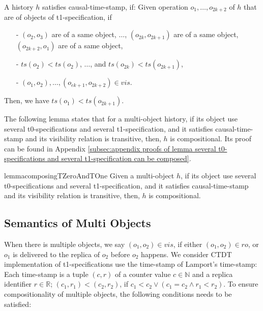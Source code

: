 A history $h$ satisfies causal-time-stamp, if: Given operation $o_1,\ldots,o_{\mathit{2k+2}}$ of $h$ that are of objects of t1-specification, if 

\begin{itemize}
\setlength{\itemsep}{0.5pt}
\item[-] $(o_2,o_3)$ are of a same object, $\ldots$, $(o_{\mathit{2k}},o_{\mathit{2k+1}})$ are of a same object, $(o_{\mathit{2k+2}},o_1)$ are of a same object, 

\item[-] $\mathit{ts}(o_2) < \mathit{ts}(o_2)$, $\ldots$, and $\mathit{ts}(o_{\mathit{2k}}) < \mathit{ts}(o_{\mathit{2k+1}})$, 

\item[-] $(o_1,o_2), \ldots, (o_{\mathit{ek+1}},o_{\mathit{2k+2}}) \in \mathit{vis}$. 
\end{itemize} 

Then, we have $\mathit{ts}(o_1) < \mathit{ts}(o_{\mathit{2k+1}})$. 

The following lemma states that for a multi-object history, if its object use several t0-specifications and several t1-specification, and it satisfies causal-time-stamp and its visibility relation is transitive, then, $h$ is compositional. Its proof can be found in Appendix \ref{subsec:appendix proofs of lemma several t0-specifications and several t1-specification can be composed}.

\begin{restatable}{lemma}{composingTZeroAndTOne}
\label{lemma:several t0-specifications and several t1-specification can be composed}
Given a multi-object $h$, if its object use several t0-specifications and several t1-specification, and it satisfies causal-time-stamp and its visibility relation is transitive, then, $h$ is compositional. 
\end{restatable} 





\subsection{Semantics of Multi Objects} 
\label{subsec:semantics of multi objects} 

When there is multiple objects, we say $(o_1,o_2) \in \mathit{vis}$, if either $(o_1,o_2) \in \mathit{ro}$, or $o_1$ is delivered to the replica of $o_2$ before $o_2$ happens. We consider CTDT implementation of t1-specifications use the time-stamp of Lamport's time-stamp: Each time-stamp is a tuple $(c,r)$ of a counter value $c \in \mathbb{N}$ and a replica identifier $r \in \mathbb{R}$; $(c_1,r_1) < (c_2,r_2)$, if $c_1 < c_2 \vee (c_1 = c_2 \wedge r_1 < r_2)$. To ensure compositionality of multiple objects, the following conditions needs to be satisfied:

